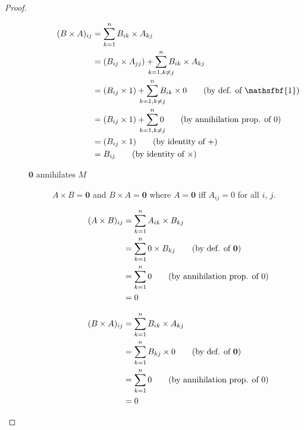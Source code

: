 \documentclass[runningheads]{llncs}
\renewcommand{\otimes}{\times}
\begin{document}
\begin{proof}
\begin{description}
\begin{description}
					\begin{align*}
						(B \otimes A)_{ij} & = \sum_{k=1}^{n} B_{ik} \times A_{kj}                                                                      \\
						                   & = (B_{ij} \times A_{jj}) + \sum_{\mathclap{k=1,k \neq j}}^{n} B_{ik} \times A_{kj}                         \\
						                   & = (B_{ij} \times 1) + \sum_{\mathclap{k=1,k \neq j}}^{n} B_{ik} \times 0\tag{by def. of \(\mathsfbf{1} \)} \\
						                   & = (B_{ij} \times 1) + \sum_{\mathclap{k=1,k \neq j}}^{n} 0\tag{by annihilation prop. of \(0\)}             \\
						                   & = (B_{ij} \times 1) \tag{by identity of \(+\)}                                                             \\
						                   & = B_{ij} \tag{by identity of \(\times \)}
					\end{align*}

				\item [\(\mathbf{0} \) annihilates \(M\)] \(A \otimes B = \mathbf{0} \) and \(B \otimes A = \mathbf{0} \) where \(A = \mathbf{0} \) iff \(A_{ij} = 0\) for all \(i\), \(j\).

				      \begin{align*}
					      (A \otimes B)_{ij} & = \sum_{k=1}^{n} A_{ik} \times B_{kj}                            \\
					                         & = \sum_{k=1}^{n} 0 \times B_{kj}\tag{by def. of \(\mathbf{0} \)} \\
					                         & = \sum_{k=1}^{n} 0 \tag{by annihilation prop. of \(0\)}          \\
					                         & = 0
				      \end{align*}

				      \begin{align*}
					      (B \otimes A)_{ij} & = \sum_{k=1}^{n} B_{ik} \times A_{kj}                             \\
					                         & = \sum_{k=1}^{n} B_{kj} \times 0 \tag{by def. of \(\mathbf{0} \)} \\
					                         & = \sum_{k=1}^{n} 0 \tag{by annihilation prop. of \(0\)}           \\
					                         & = 0
				      \end{align*}


\end{description}
\end{description}
\end{proof}
\end{document}
